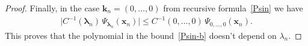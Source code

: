 \documentclass[10pt,a4paper]{amsart}
\begin{document}
\begin{proof}
	Finally, in the case $\bm{k}_n = (0, \dots, 0)$ from recursive formula~\eqref{Psin} we have
	\begin{align}
		\bigl| C^{-1}(\bm{\lambda}_n) \, \Psi_{\bm{\lambda}_n}(\bm{x}_n) \bigr| \leq C^{-1}(0, \dots, 0) \, \Psi_{0, \dots, 0}(\bm{x}_n).
	\end{align}
	This proves that the polynomial in the bound~\eqref{Psin-b} doesn't depend on $\lambda_n$.
\end{proof}
\end{document}
